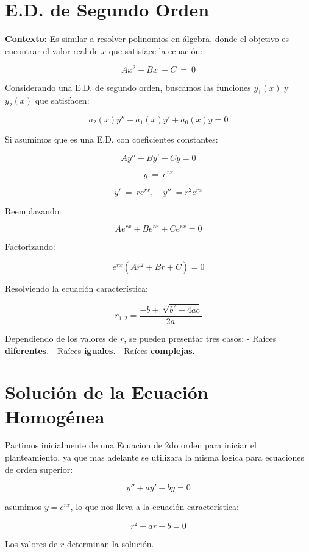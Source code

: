 \section{E.D. de Segundo Orden}

\textbf{Contexto:} Es similar a resolver polinomios en álgebra, donde el objetivo es encontrar el valor real de \( x \) que satisface la ecuación:

\[
Ax^{2} +Bx\ +C\ =\ 0
\]

Considerando una E.D. de segundo orden, buscamos las funciones \( y_{1}(x) \) y \( y_{2}(x) \) que satisfacen:

\[
a_{2}( x) y''+a_{1}( x) y'+a_{0}( x) y=0
\]

Si asumimos que es una E.D. con coeficientes constantes:

\[
Ay''+By'+Cy=0
\]

\[
y\ =\ e^{r x}
\]

\[
y'\ =\ re^{r x}, \quad y''\ =r^{2} e^{r x}
\]

Reemplazando:

\[
Ae^{r x} +Be^{r x} +Ce^{r x} =0
\]

Factorizando:

\[
e^{r x}( Ar^{2} +Br+C) =0
\]

Resolviendo la ecuación característica:

\[
r_{1,2} = \frac{-b\pm \ \sqrt{b^{2} -4ac}}{2a}
\]

Dependiendo de los valores de \( r \), se pueden presentar tres casos:
- Raíces \textbf{diferentes}.
- Raíces \textbf{iguales}.
- Raíces \textbf{complejas}.



\section{Solución de la Ecuación Homogénea}
Partimos inicialmente de una Ecuacion de 2do orden para iniciar el planteamiento, ya que mas adelante se utilizara la misma logica para ecuaciones de orden superior:

\begin{equation}
y'' + ay' + by = 0
\end{equation}

asumimos \( y = e^{rx} \), lo que nos lleva a la ecuación característica:

\begin{equation}
r^2 + ar + b = 0
\end{equation}

Los valores de \( r \) determinan la solución.


